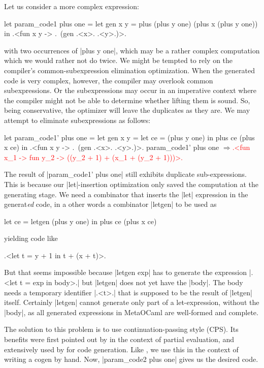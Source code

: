 \documentclass{elsart}
\newcommand{\evalresult}[1]{\ensuremath{\Longrightarrow}\textcolor{red}{#1}}
\begin{document}
Let us consider a more complex expression:
\begin{code}
let param_code1 plus one =
  let gen x y = plus (plus y one) (plus x (plus y one)) in
  .<fun x y -> .~(gen .<x>. .<y>.)>.
\end{code}
with two occurrences of |plus y one|,
which may be a rather complex computation which we would rather not do
twice. We might be tempted to rely on the compiler's
common-subexpression elimination optimization. When the generated code is
very complex, however, the compiler may overlook common subexpressions.  Or the
subexpressions may occur in an imperative context where the compiler
might not be able to determine whether lifting them is sound. So, being
conservative, the optimizer will leave the duplicates as they are. 
We may attempt to eliminate subexpressions as follows: 
\begin{code}[commandchars=\\\{\}]
let param_code1' plus one =
  let gen x y = let ce = (plus y one) in  plus ce (plus x ce) in
  .<fun x y -> .~(gen .<x>. .<y>.)>.
param_code1' plus one
\evalresult{.<fun x_1 -> fun y_2 -> ((y_2 + 1) + (x_1 + (y_2 + 1)))>.}
\end{code}
The result of |param_code1' plus one| still exhibits duplicate
sub-expressions.  This is because our |let|-insertion optimization only saved
the computation at the generating stage.  We need a combinator that
inserts the |let| expression in the generat\emph{ed} code, in a other words a
combinator |letgen| to be used as
\begin{code}
let ce = letgen (plus y one) in plus ce (plus x ce)
\end{code}
yielding code like 
\begin{code}
.<let t = y + 1 in t + (x + t)>.
\end{code}
But that seems impossible because |letgen exp| has to generate
the expression |.<let t = exp in body>.| but |letgen| does not yet
have the |body|. The body needs a temporary identifier |.<t>.|
that is supposed to be the result of |letgen| itself.  Certainly
|letgen| cannot generate only part of a let-expression, without the
|body|, as all generated expressions in MetaOCaml are well-formed and
complete.

The solution to this problem is to use continuation-passing style (CPS). Its
benefits were first pointed out by \cite{Bondorf:92} in the context of partial
evaluation, and extensively used by \cite{SwadiMonadic06,KiselyovTaha} for
code generation. Like \cite{conf/pepm/BondorfD94}, we use this in the 
context of writing a cogen by hand.  Now, |param_code2 plus one| gives us the
desired code.
\end{document}
